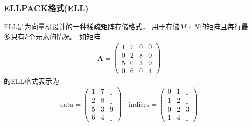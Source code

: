 \subsubsection{ELLPACK格式(ELL)}
ELL是为向量机设计的一种稀疏矩阵存储格式，
用于存储$M\times N$的矩阵且每行最多只有$k$个元素的情况。\cite{grimes1979itpack}
如矩阵\cite{bell2008spmv}
\begin{align*}
\bm{A}=\begin{pmatrix}
1 & 7 & 0 & 0\\
0 & 2 & 8 & 0\\
5 & 0 & 3 & 9\\
0 & 6 & 0 & 4
\end{pmatrix}
\end{align*}
的ELL格式表示为
\begin{align*}
\mathrm{data}=\begin{pmatrix}
1 & 7 & \_\\
2 & 8 & \_\\
5 & 3 & 9 \\
6 & 4 & \_
\end{pmatrix}
\quad
\mathrm{indices}=\begin{pmatrix}
0 & 1 & \_\\
1 & 2 & \_\\
0 & 2 & 3\\
1 & 4 & \_
\end{pmatrix}
\end{align*}

